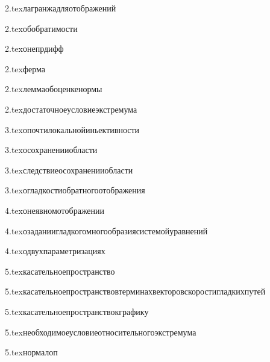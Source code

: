 {2.tex}{лагранжадляотображений}

{2.tex}{обобратимости}

{2.tex}{онепрдифф}

{2.tex}{ферма}

{2.tex}{леммаобоценкенормы}

{2.tex}{достаточноеусловиеэкстремума}

{3.tex}{опочтилокальнойиньективности}

{3.tex}{осохраненииобласти}

{3.tex}{следствиеосохраненииобласти}

{3.tex}{огладкостиобратногоотображения}

{4.tex}{онеявномотображении}

{4.tex}{озаданиигладкогомногообразиясистемойуравнений}

{4.tex}{одвухпараметризациях}

{5.tex}{касательноепространство}

{5.tex}{касательноепространствовтерминахвекторовскоростигладкихпутей}

{5.tex}{касательноепространствокграфику}

{5.tex}{необходимоеусловиеотносительногоэкстремума}

{5.tex}{нормалоп}

